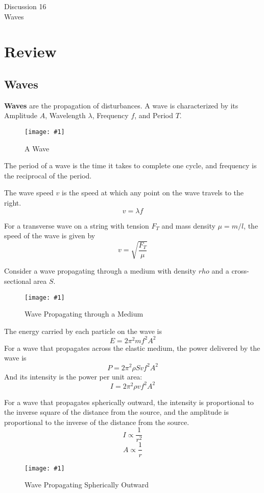 \documentclass[11pt]{article}
\newcommand{\fig}[4]{
    \begin{figure}[H]
        \centering
        \texttt{[image: \#1]}
        \caption{#2}
        \label{exp4fit}
    \end{figure}
}
\theoremstyle{gangnamstyle}{\newtheorem{definition}{Definition}[]}
\theoremstyle{gangnamstyle}{\newtheorem{example}{Example}[]}
\theoremstyle{gangnamstyle}{\newtheorem{problem}{Problem}[]}
\begin{document}
\normalfont
\pagestyle{pages}


\begin{center}
\vspace{3in}
{\Large Discussion 16 } \\ [0.05in]
Waves \\ [-0.5in]
\end{center}

\section{Review}

\subsection{Waves}

\textbf{Waves} are the propagation of disturbances. A wave is characterized by its Amplitude $A$, Wavelength $\lambda$, Frequency $f$, and Period $T$. 

\fig{figs/0730/wave.png}{A Wave}{0.6}{0}

The period of a wave is the time it takes to complete one cycle, and frequency is the reciprocal of the period. 

The wave speed $v$ is the speed at which any point on the wave travels to the right. 
\[ v = \lambda f \]

For a transverse wave on a string with tension $F_T$ and mass density $\mu = m/l$, the speed of the wave is given by
\[ v = \sqrt{\frac{F_T}{\mu}} \]

Consider a wave propagating through a medium with density $rho$ and a cross-sectional area $S$. 
\fig{figs/0730/medium.png}{Wave Propagating through a Medium}{0.75}{0}

The energy carried by each particle on the wave is
\[ E = 2\pi^2mf^2A^2 \]
For a wave that propagates across the elastic medium, the power delivered by the wave is
\[ P = 2\pi^2\rho Svf^2A^2 \]
And its intensity is the power per unit area: 
\[ I = 2\pi^2\rho vf^2A^2 \]

For a wave that propagates spherically outward, the intensity is proportional to the inverse square of the distance from the source, and the amplitude is proportional to the inverse of the distance from the source. 
\[ I \propto \frac{1}{r^2} \]
\[ A \propto \frac{1}{r} \]

\fig{figs/0730/sphere.png}{Wave Propagating Spherically Outward}{0.5}{0}
\end{document}
